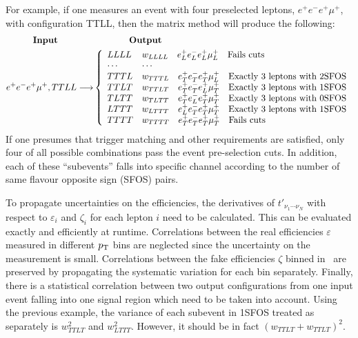 For example, if one measures an event with four preselected leptons,
$e^+e^-e^+\mu^+$, with configuration TTLL, then the matrix method will produce
the following:
\begin{align*}
  \textrm{\textbf{Input}} \qquad\qquad & \qquad\qquad\textrm{\textbf{Output}} \\
  e^+e^-e^+\mu^+, TTLL \longrightarrow& \left\{
  \begin{array}{ll}
    LLLL & w_{LLLL} \quad e^+_Le^-_Le^+_L\mu^+_L \quad \textrm{Fails cuts} \\
    \cdots & \cdots \\
    TTTL & w_{TTTL} \quad e^+_Te^-_Te^+_T\mu^+_L \quad \textrm{Exactly 3 leptons with 2SFOS} \\
    TTLT & w_{TTLT} \quad e^+_Te^-_Te^+_L\mu^+_T \quad \textrm{Exactly 3 leptons with 1SFOS} \\
    TLTT & w_{TLTT} \quad e^+_Te^-_Le^+_T\mu^+_T \quad \textrm{Exactly 3 leptons with 0SFOS} \\
    LTTT & w_{LTTT} \quad e^+_Le^-_Te^+_T\mu^+_T \quad \textrm{Exactly 3 leptons with 1SFOS} \\
    TTTT & w_{TTTT} \quad e^+_Te^-_Te^+_T\mu^+_T \quad \textrm{Fails cuts}
  \end{array}
  \right.
\end{align*}
If one presumes that trigger matching and other requirements are satisfied, only four of all possible combinations pass the event pre-selection cuts. In addition, each of these ``subevents'' falls into specific channel according to the number of same flavour opposite sign (SFOS) pairs.

To propagate uncertainties on the efficiencies, the derivatives of $t'_{\nu_1\cdots\nu_N}$ with respect to $\varepsilon_i$ and $\zeta_i$ for each lepton $i$ need to be calculated. This can be evaluated exactly and efficiently at runtime. Correlations between the real efficiencies $\varepsilon$ measured in different  $p_{\mathrm{T}}$ bins are neglected since the uncertainty on the measurement is small. Correlations between the fake efficiencies $\zeta$ binned in \pt\ are preserved by propagating the systematic variation for each bin separately. Finally, there is a statistical correlation between two output configurations from one input event falling into one signal region which need to be taken into account. Using the previous example, the variance of each subevent in 1SFOS treated as separately is $w^2_{TTLT}$ and $w^2_{LTTT}$. However, it should be in fact $(w_{TTLT} +w_{TTLT})^2$. %

